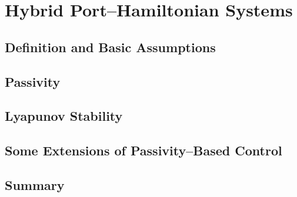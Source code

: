 
\chapter{Hybrid Port--Hamiltonian Systems}

\label{chap:HPH_systems}
\minitoc

\thispagestyle{empty}

\newpage
\section{Definition and Basic Assumptions}

\clearpage

\section{Passivity}

\clearpage
\section{Lyapunov Stability}

\clearpage

\section{Some Extensions of Passivity--Based Control}

\clearpage

\section{Summary}
